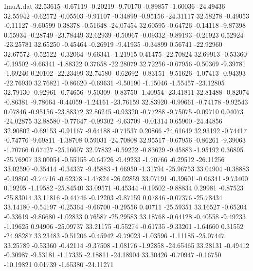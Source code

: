 \begin{filecontents}{ImuA.dat}
  32.53615   -0.67119   -0.20219   -9.70170   -0.89857   -1.60036  -24.49436
  32.55942   -0.62572   -0.05503   -9.91107   -0.34899   -0.95156  -24.31117
  32.58278   -0.49053   -0.11127   -9.60599    0.38378   -0.51648  -24.07454
  32.60595   -0.64726   -0.14118   -9.87398    0.55934   -0.28749  -23.78449
  32.62939   -0.50967   -0.09332   -9.89193   -0.21923    0.52924  -23.25781
  32.65250   -0.45464   -0.26919   -9.41935   -0.34899    0.56741  -22.92960
  32.67572   -0.52522   -0.32064   -9.66341   -1.21915    0.41475  -22.70824
  32.69913   -0.53360   -0.19502   -9.66341   -1.88322    0.37658  -22.28079
  32.72256   -0.67956   -0.50369   -9.39781   -1.69240    0.20102  -22.23499
  32.74580   -0.62692   -0.83151   -9.51626   -1.07413   -0.94393  -22.76930
  32.76821   -0.86620   -0.69631   -9.50190   -1.15046   -1.55457  -23.12805
  32.79130   -0.92961   -0.74656   -9.50309   -0.83750   -1.40954  -23.41811
  32.81488   -0.82074   -0.86381   -9.78664   -0.44059   -1.24161  -23.76159
  32.83920   -0.99661   -0.74178   -9.92543    0.07846   -0.95156  -23.88372
  32.86245   -0.93320   -0.77288   -9.75075   -0.09710    0.04073  -24.02875
  32.88580   -0.77647   -0.99302   -9.63709   -0.01314    0.65900  -24.44856
  32.90802   -0.69153   -0.91167   -9.64188   -0.71537    0.20866  -24.61649
  32.93192   -0.74417   -0.74776   -9.69811   -1.38708    0.59031  -24.70808
  32.95517   -0.67956   -0.86261   -9.39063   -1.70766    0.67427  -25.16607
  32.97832   -0.59222   -0.83629   -9.45883   -1.95192    0.36895  -25.76907
  33.00054   -0.55155   -0.64726   -9.49233   -1.70766   -0.29512  -26.11256
  33.02590   -0.35414   -0.34337   -9.45883   -1.66950   -1.31794  -25.96753
  33.04904   -0.38883   -0.19860   -9.74716   -0.62378   -1.47824  -26.02859
  33.07191   -0.39601   -0.06341   -9.73400    0.19295   -1.19582  -25.84540
  33.09571   -0.45344   -0.19502   -9.88834    0.29981   -0.87523  -25.83014
  33.11816   -0.44746   -0.12203   -9.87159    0.07846   -0.07376  -25.78434
  33.14180   -0.54197   -0.25364   -9.66700   -0.29556    0.40711  -25.59351
  33.16527   -0.65204   -0.33619   -9.86680   -1.02833    0.76587  -25.29583
  33.18768   -0.64128   -0.40558   -9.49233   -1.19625    0.94906  -25.09737
  33.21175   -0.55274   -0.61735   -9.33201   -1.64660    0.31552  -24.98287
  33.23483   -0.51206   -0.45942   -9.79023   -1.03596   -1.11185  -25.07447
  33.25789   -0.53360   -0.42114   -9.37508   -1.08176   -1.92858  -24.65465
  33.28131   -0.49412   -0.30987   -9.53181   -1.17335   -2.18811  -24.18904
  33.30426   -0.70947   -0.16750  -10.19821    0.01739   -1.65380  -24.11271

\end{filecontents}

